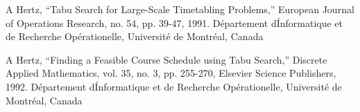 \begin{thebibliography}{99}
A Hertz, “Tabu Search for Large-Scale Timetabling Problems,” European Journal of
Operations Research, no. 54, pp. 39-47, 1991. D\'epartement d\'Informatique et de
Recherche Op\'erationelle, Universit\'e de Montr\'eal, Canada

A Hertz, “Finding a Feasible Course Schedule using Tabu Search,” Discrete Applied
Mathematics, vol. 35, no. 3, pp. 255-270, Elsevier Science Publishers, 1992.
D\'epartement d\'Informatique et de Recherche Op\'erationelle, Universit\'e de
Montr\'eal, Canada

\end{thebibliography}